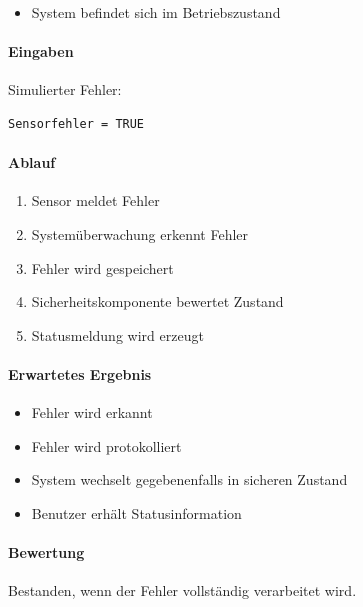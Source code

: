 \begin{itemize}
\tightlist
\item
  System befindet sich im Betriebszustand
\end{itemize}

\paragraph{Eingaben}\label{eingaben-14}

Simulierter Fehler:

\begin{verbatim}
Sensorfehler = TRUE
\end{verbatim}

\paragraph{Ablauf}\label{ablauf-14}

\begin{enumerate}
\def\labelenumi{\arabic{enumi}.}
\tightlist
\item
  Sensor meldet Fehler
\item
  Systemüberwachung erkennt Fehler
\item
  Fehler wird gespeichert
\item
  Sicherheitskomponente bewertet Zustand
\item
  Statusmeldung wird erzeugt
\end{enumerate}

\paragraph{Erwartetes Ergebnis}\label{erwartetes-ergebnis-14}

\begin{itemize}
\tightlist
\item
  Fehler wird erkannt
\item
  Fehler wird protokolliert
\item
  System wechselt gegebenenfalls in sicheren Zustand
\item
  Benutzer erhält Statusinformation
\end{itemize}

\paragraph{Bewertung}\label{bewertung-14}

Bestanden, wenn der Fehler vollständig verarbeitet wird.

